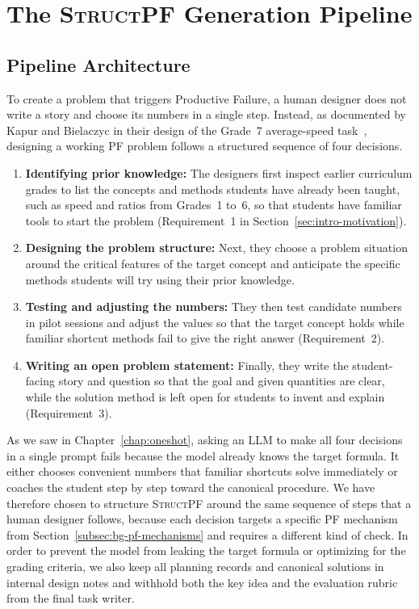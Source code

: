 \chapter{The \textsc{StructPF} Generation Pipeline}
\label{chap:structpf}

\section{Pipeline Architecture}
\label{sec:structpf-overview}

To create a problem that triggers Productive Failure, a human designer does not write a story and choose its numbers in a single step. Instead, as documented by Kapur and Bielaczyc in their design of the Grade~7 average-speed task~\cite{kapur2012}, designing a working PF problem follows a structured sequence of four decisions.
\begin{enumerate}[leftmargin=0.7cm,itemsep=0.25em,topsep=0.3em]
    \item \textbf{Identifying prior knowledge:} The designers first inspect earlier curriculum grades to list the concepts and methods students have already been taught, such as speed and ratios from Grades~1 to~6, so that students have familiar tools to start the problem (Requirement~1 in Section~\ref{sec:intro-motivation}).
    \item \textbf{Designing the problem structure:} Next, they choose a problem situation around the critical features of the target concept and anticipate the specific methods students will try using their prior knowledge.
    \item \textbf{Testing and adjusting the numbers:} They then test candidate numbers in pilot sessions and adjust the values so that the target concept holds while familiar shortcut methods fail to give the right answer (Requirement~2).
    \item \textbf{Writing an open problem statement:} Finally, they write the student-facing story and question so that the goal and given quantities are clear, while the solution method is left open for students to invent and explain (Requirement~3).
\end{enumerate}

As we saw in Chapter~\ref{chap:oneshot}, asking an LLM to make all four decisions in a single prompt fails because the model already knows the target formula. It either chooses convenient numbers that familiar shortcuts solve immediately or coaches the student step by step toward the canonical procedure. We have therefore chosen to structure \textsc{StructPF} around the same sequence of steps that a human designer follows, because each decision targets a specific PF mechanism from Section~\ref{subsec:bg-pf-mechanisms} and requires a different kind of check. In order to prevent the model from leaking the target formula or optimizing for the grading criteria, we also keep all planning records and canonical solutions in internal design notes and withhold both the key idea and the evaluation rubric from the final task writer.

